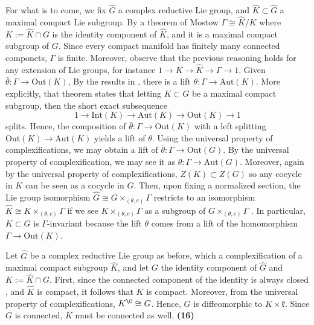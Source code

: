 For what is to come, we fix \(\hat{G}\) a complex reductive Lie group, and \(\hat{K} \subset \hat{G}\) a maximal compact Lie subgroup. By a theorem of Mostow \parencite[Th. 3.1]{mostow1955self} \(\Gamma\cong\hat{K}/K\) where \(K:=\hat{K} \cap G\) is the identity component of \(\hat{K}\), and it is a maximal compact subgroup of \(G\). Since every compact manifold has finitely many connected componets, \(\Gamma\) is finite. Moreover, observe that the previous reasoning holds for any extension of Lie groups, for instance \(1 \to K \to \hat{K}\to \Gamma \to 1\). Given \(\bar{\theta}\colon \Gamma \to \mathrm{Out}(K)\), By the results in \parencite[See Ch I, Sec 2]{de1956groupes}, there is a lift \(\theta\colon \Gamma \to \mathrm{Aut}(K)\). More explicitly, that theorem states that letting \(K\subset G\) be a maximal compact subgroup, then the short exact subsequence
\[
1 \to \mathrm{Int}(K) \to \mathrm{Aut}(K) \to \mathrm{Out}(K) \to 1
\]
splits. Hence, the composition of \(\bar{\theta}\colon \Gamma \to \mathrm{Out}(K)\) with a left splitting \(\mathrm{Out}(K) \to \mathrm{Aut}(K)\) yields a lift of \(\theta\). Using the universal property of complexifications, we may obtain a lift of \(\bar\theta\colon \Gamma\to \mathrm{Out}(G)\). By the universal property of complexification, we may see it as \(\theta\colon \Gamma \to \mathrm{Aut}(G)\). Moreover, again by the universal property of complexifications, \(Z(K)\subset Z(G)\) so any cocycle in \(K\) can be seen as a cocycle in \(G\). Then, upon fixing a normalized section, the Lie group isomorphism \(\hat{G} \cong G \times_{(\theta, c)} \Gamma\) restricts to an isomorphism \(\hat{K}\cong K \times_{(\theta, c)}\Gamma\) if we see \(K \times_{(\theta, c)}\Gamma\) as a subgroup of \(G \times_{(\theta, c)}\Gamma\) \parencite[Prop. 2.2]{barajas2023non}. In particular, \(K \subset G\) is \(\Gamma\)-invariant because the lift \(\theta\) comes from a lift of the homomorphism \(\Gamma \to \mathrm{Out}(K)\).

\begin{obs} \label{k_connected_kc_G}
    Let \(\hat{G}\) be a complex reductive Lie group as before, which a complexification of a maximal compact subgroup \(\hat{K}\), and let \(G\) the identity component of \(\hat{G}\) and \(K:=\hat{K}\cap G\). First, since the connected component of the identity is always closed \parencite[Lemma 7.11 and Prop. 7.15]{lee_introCM}, and \(\hat{K}\) is compact, it follows that \(K\) is compact. Moreover, from the universal property of complexifications, \(K^\C \cong G\). Hence, \(G\) is diffeomorphic to \(K \times \mathfrak{k}\). Since \(G\) is connected, \(K\) must be connected as well. {\color{purple}\textbf{(16)}}
\end{obs}

